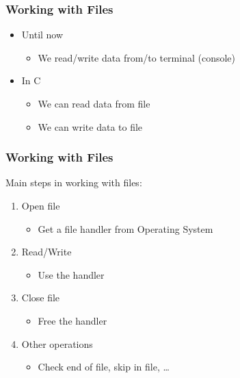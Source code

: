 \documentclass{../c-lecture}
\begin{document}
\begin{frame}
  \frametitle{Working with Files}
  \begin{itemize}
    \item Until now
    \begin{itemize}
      \item We read/write data from/to terminal (console)
    \end{itemize}
    \item In C
    \begin{itemize}
      \item We can read data from file
      \item We can write data to file
    \end{itemize}
  \end{itemize}
\end{frame}

\begin{frame}
  \frametitle{Working with Files}
  Main steps in working with files:
  \begin{enumerate}
    \item Open file
    \begin{itemize}
      \item Get a file handler from Operating System
    \end{itemize}
    \item Read/Write
    \begin{itemize}
      \item Use the handler
    \end{itemize}
    \item Close file
    \begin{itemize}
      \item Free the handler
    \end{itemize}
    \item Other operations
    \begin{itemize}
      \item Check end of file, skip in file, \ldots
    \end{itemize}
  \end{enumerate}
\end{frame}
\end{document}
